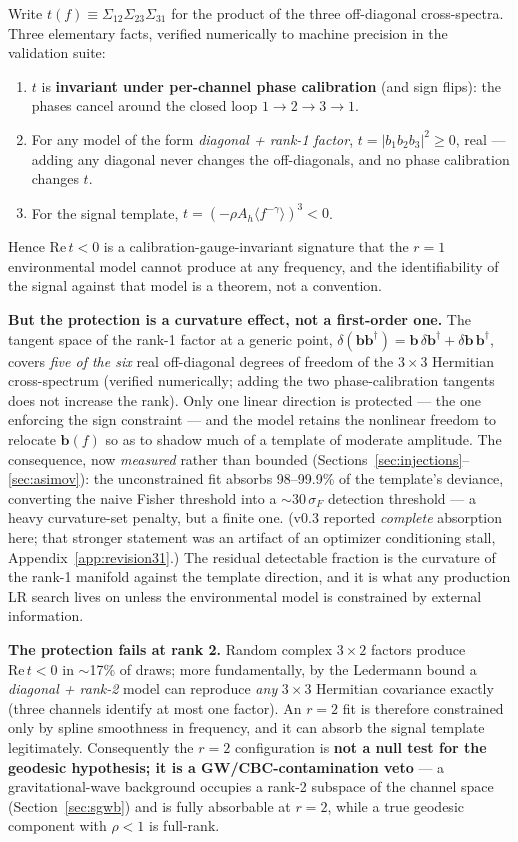 \documentclass[11pt]{article}
\newcommand{\Ah}{A_h}
\begin{document}
Write $t(f) \equiv \Sigma_{12}\Sigma_{23}\Sigma_{31}$ for the product of the three off-diagonal cross-spectra. Three elementary facts, verified numerically to machine precision in the validation suite:
\begin{enumerate}
\item $t$ is \textbf{invariant under per-channel phase calibration} (and sign flips): the phases cancel around the closed loop $1\to2\to3\to1$.
\item For any model of the form \emph{diagonal + rank-1 factor}, $t = |b_1 b_2 b_3|^2 \ge 0$, real --- adding any diagonal never changes the off-diagonals, and no phase calibration changes $t$.
\item For the signal template, $t = \left(-\rho \Ah \langle f^{-\gamma}\rangle\right)^{3} < 0$.
\end{enumerate}
Hence $\mathrm{Re}\,t < 0$ is a calibration-gauge-invariant signature that the $r=1$ environmental model cannot produce at any frequency, and the identifiability of the signal against that model is a theorem, not a convention.

\textbf{But the protection is a curvature effect, not a first-order one.} The tangent space of the rank-1 factor at a generic point, $\delta(\mathbf{b}\mathbf{b}^\dagger) = \mathbf{b}\,\delta\mathbf{b}^\dagger + \delta\mathbf{b}\,\mathbf{b}^\dagger$, covers \emph{five of the six} real off-diagonal degrees of freedom of the $3\times3$ Hermitian cross-spectrum (verified numerically; adding the two phase-calibration tangents does not increase the rank). Only one linear direction is protected --- the one enforcing the sign constraint --- and the model retains the nonlinear freedom to relocate $\mathbf{b}(f)$ so as to shadow much of a template of moderate amplitude. The consequence, now \emph{measured} rather than bounded (Sections~\ref{sec:injections}--\ref{sec:asimov}): the unconstrained fit absorbs 98--99.9\% of the template's deviance, converting the naive Fisher threshold into a $\sim$$30\,\sigma_F$ detection threshold --- a heavy curvature-set penalty, but a finite one. (v0.3 reported \emph{complete} absorption here; that stronger statement was an artifact of an optimizer conditioning stall, Appendix~\ref{app:revision31}.) The residual detectable fraction is the curvature of the rank-1 manifold against the template direction, and it is what any production LR search lives on unless the environmental model is constrained by external information.

\textbf{The protection fails at rank 2.} Random complex $3\times2$ factors produce $\mathrm{Re}\,t<0$ in $\sim$17\% of draws; more fundamentally, by the Ledermann bound a \emph{diagonal + rank-2} model can reproduce \emph{any} $3\times3$ Hermitian covariance exactly (three channels identify at most one factor). An $r=2$ fit is therefore constrained only by spline smoothness in frequency, and it can absorb the signal template legitimately. Consequently the $r=2$ configuration is \textbf{not a null test for the geodesic hypothesis; it is a GW/CBC-contamination veto} --- a gravitational-wave background occupies a rank-2 subspace of the channel space (Section~\ref{sec:sgwb}) and is fully absorbable at $r=2$, while a true geodesic component with $\rho < 1$ is full-rank.
\end{document}
